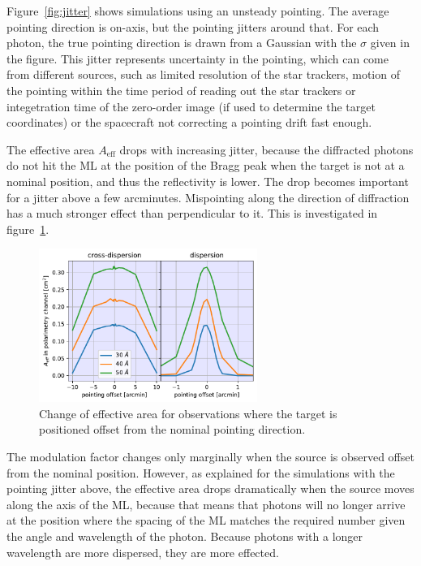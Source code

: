 \documentclass[]{spie}  %
\begin{document}
Figure~\ref{fig:jitter} shows simulations using an unsteady
pointing. The average pointing direction is on-axis, but the pointing
jitters around that. For each photon, the true pointing direction is
drawn from a Gaussian with the $\sigma$ given in the figure. This
jitter represents uncertainty in the pointing, which can come from
different sources, such as limited resolution of the star trackers,
motion of the pointing within the time period of reading out the star
trackers or integetration time of the zero-order image (if used to
determine the target coordinates) or the spacecraft not correcting a
pointing drift fast enough.

The effective area $A_{\mathrm{eff}}$ drops with increasing jitter,
because the diffracted photons do not hit the ML at the position of
the Bragg peak when the target is not at a nominal position, and thus
the reflectivity is lower. The drop becomes important for a jitter
above a few arcminutes. Mispointing along the direction of diffraction
has a much stronger effect than perpendicular to it. This is
investigated in figure~\ref{fig:offset_point}.

\begin{figure} [ht]
  \begin{center}
    \includegraphics[height=5cm]{offset_point.pdf}
  \end{center}
  \caption
      { \label{fig:offset_point}Change of effective area for observations where the target is positioned offset from the nominal pointing direction. 
}
\end{figure}

The modulation factor changes only marginally when the source is
observed offset from the nominal position. However, as explained for
the simulations with the pointing jitter above, the effective area
drops dramatically when the source moves along the axis of the ML,
because that means that photons will no longer arrive at the position
where the spacing of the ML matches the required number given the
angle and wavelength of the photon. Because photons with a longer
wavelength are more dispersed, they are more effected.
\end{document}
